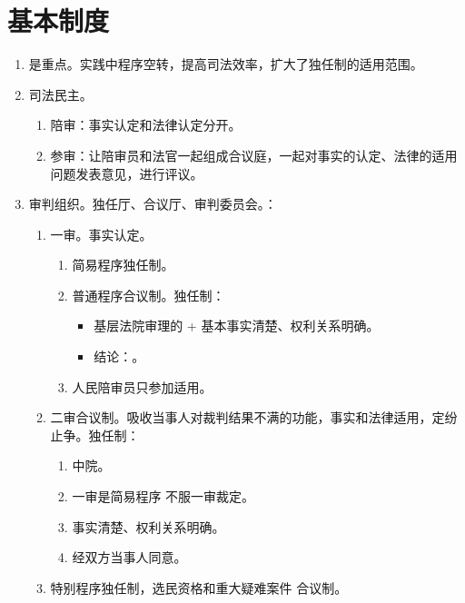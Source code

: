 \section{基本制度}
\begin{enumerate}
  \item {}是重点。实践中程序空转，提高司法效率，扩大了独任制的适用范围。
  \item 司法民主。
        \begin{enumerate}
          \item 陪审：事实认定和法律认定分开。
          \item 参审：让陪审员和法官一起组成合议庭，一起对事实的认定、法律的适用问题发表意见，进行评议。
        \end{enumerate}
  \item 审判组织。独任厅、合议厅、审判委员会。：
        \begin{enumerate}
          \item 一审。事实认定。
                \begin{enumerate}
                  \item 简易程序独任制。
                  \item 普通程序合议制。独任制：
                        \begin{itemize}
                          \item 基层法院审理的 + 基本事实清楚、权利关系明确。
                          \item 结论：。
                        \end{itemize}
                  \item 人民陪审员只参加适用。
                \end{enumerate}
          \item 二审合议制。吸收当事人对裁判结果不满的功能，事实和法律适用，定纷止争。独任制：
                \begin{enumerate}
                  \item 中院。
                  \item 一审是简易程序 \hz 不服一审裁定。
                  \item 事实清楚、权利关系明确。
                  \item 经双方当事人同意。
                \end{enumerate}
          \item 特别程序独任制，选民资格和重大疑难案件 \yjt 合议制。

\end{enumerate}
\end{enumerate}
